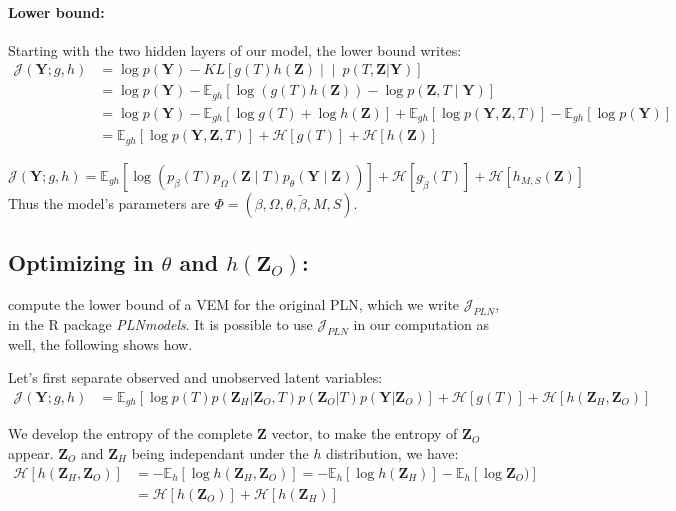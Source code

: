 \documentclass[11pt,a4paper]{article}
\newcommand{\entr}{\mathcal{H}}
\newcommand{\Ybf}{\boldsymbol{Y}}
\newcommand{\Zbf}{\boldsymbol{Z}}
\newcommand{\Esp}{\mathds{E}}
\begin{document}
\paragraph{Lower bound:}
Starting with the two hidden layers of our model, the lower bound writes:
\begin{align*}
\mathcal{J}(\Ybf; g,h)&=\log p(\Ybf) - KL\left[g(T) h(\Zbf) \middle\vert\middle\vert\ p(T,\Zbf | \Ybf)\right]\\
&= \log p(\Ybf) - \Esp_{gh}[\log( g(T) h(\Zbf)) - \log p(\Zbf,T\mid \Ybf) ]\\
&= \log p(\Ybf) - \Esp_{gh}[\log g(T) + \log h(\Zbf) ] + \Esp_{gh}[\log p(\Ybf,\Zbf,T)] - \Esp_{gh}[\log p(\Ybf)]\\
&= \Esp_{gh} [\log p(\Ybf,\Zbf,T)] + \entr[g(T)] + \entr[h(\Zbf)]
\end{align*}

\begin{equation}
\label{firstJ}
 \boxed{\mathcal{J}(\Ybf; g,h) = \Esp_{gh} [\log (p_\beta(T)p_{\Omega}(\Zbf\mid T)p_\theta(\Ybf\mid \Zbf))] + \entr[g_{\widetilde{\beta}}(T)] + \entr[h_{M,S}(\Zbf)]}
\end{equation}
Thus the model's parameters are $\Phi = (\beta, \Omega, \theta, \widetilde{\beta},M,S)$.
\subsection{Optimizing in $\theta$ and $h(\Zbf_O)$:}
\citet{CMR18} compute the lower bound of a VEM for the original PLN, which we write $\mathcal{J}_{PLN}$,  in the R package \textit{PLNmodels}. It is possible to use $\mathcal{J}_{PLN}$ in our computation as well, the following shows how.

Let's first separate observed and unobserved latent variables:
\begin{align*}
\mathcal{J}(\Ybf; g,h)&= \Esp_{gh}[\log p(T)  p(\Zbf_H| \Zbf_O,T) p(\Zbf_O|T)p(\Ybf|\Zbf_O)] + \entr[g(T)] +\entr[h(\Zbf_H,\Zbf_O)]
\end{align*}

 We develop the entropy of the complete $\Zbf$ vector, to make the entropy of $\Zbf_O$ appear. $\Zbf_O$ and $\Zbf_H$ being independant under the $h$ distribution, we have:
\begin{align*}
\entr[h(\Zbf_H,\Zbf_O)] &= -\Esp_h[\log h(\Zbf_H,\Zbf_O)] =-\Esp_h[\log h(\Zbf_H)] - \Esp_h[\log \Zbf_O)]\\
&=\entr[h(\Zbf_O)] +\entr[h(\Zbf_H)]
\end{align*}
\end{document}
